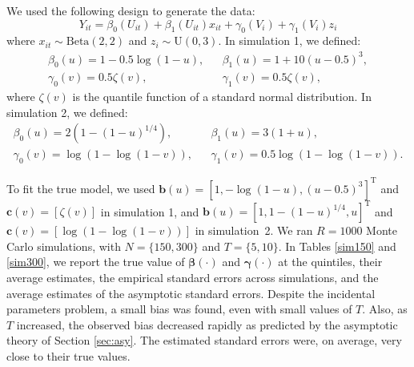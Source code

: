 \documentclass[12pt]{article}
\def\T{{ \mathrm{\scriptscriptstyle T} }}
\def\betavec{\bm{\beta}}
\def\gammavec{\bm{\gamma}}
\def\bvec{\bm{b}}
\def\cvec{\bm{c}}
\begin{document}
We used the following design to generate the data:
\[Y_{it} = \beta_0(U_{it}) + \beta_1(U_{it})x_{it} + \gamma_0(V_i) + \gamma_1(V_i)z_i\]
where $x_{it} \sim \text{Beta}(2,2)$ and $z_i \sim \text{U}(0,3)$.  In simulation 1, we defined:
\begin{eqnarray}
\beta_0(u) = 1 - 0.5\log(1 - u), & & \beta_1(u) = 1 + 10(u - 0.5)^3, \nonumber\\ 
\gamma_0(v) = 0.5\zeta(v), & & \gamma_1(v) = 0.5\zeta(v), \nonumber
\end{eqnarray}
where $\zeta(v)$ is the quantile function of a standard normal distribution. In simulation 2, we defined: 
\begin{eqnarray}
\beta_0(u) = 2(1 - (1 - u)^{1/4}), & & \beta_1(u) = 3(1 + u), \nonumber\\
\gamma_0(v) = \log(1 - \log(1 - v)), & & \gamma_1(v) = 0.5\log(1 - \log(1 - v)). \nonumber
\end{eqnarray}

To fit the true model, we used $\bvec(u) = \left[1, -\log(1 - u), (u - 0.5)^3\right]^{\T}$ and $\cvec(v) = \left[\zeta(v)\right]$
in simulation 1, and $\bvec(u) = \left[1, 1 - (1 - u)^{1/4}, u\right]^{\T}$ and $\cvec(v) = \left[\log(1 - \log(1 - v))\right]$ in simulation~2.
We ran $R = 1000$ Monte Carlo simulations, with $N = \{150, 300\}$ and $T = \{5, 10\}$. 
In Tables \ref{sim150} and \ref{sim300}, we report the true value of $\betavec(\cdot)$ and $\gammavec(\cdot)$ at the quintiles,
their average estimates, the empirical standard errors across simulations, and the average estimates of the asymptotic standard errors.
Despite the incidental parameters problem, a small bias was found, even with small values of $T$. Also, as $T$ increased,
the observed bias decreased rapidly as predicted by the asymptotic theory of Section \ref{sec:asy}. The estimated standard errors were, on average, very close to their true values.
\end{document}
